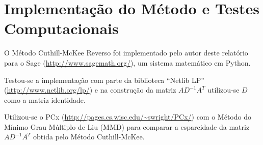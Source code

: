 \section{Implementação do Método e Testes Computacionais}
O Método Cuthill-McKee Reverso foi implementado pelo autor deste relatório para
o Sage (\url{http://www.sagemath.org/}), um sistema matemático em Python. 

Testou-se a implementação com parte da biblioteca ``Netlib LP''
(\url{http://www.netlib.org/lp/}) e na construção da matriz $A D^{-1} A^T$
utilizou-se $D$ como a matriz identidade.

Utilizou-se o PCx (\url{http://pages.cs.wisc.edu/~swright/PCx/}) com o Método do
Mínimo Grau Múltiplo de Liu (MMD) para comparar a
esparcidade da matriz $A D^{-1} A^T$ obtida pelo Método Cuthill-McKee.
